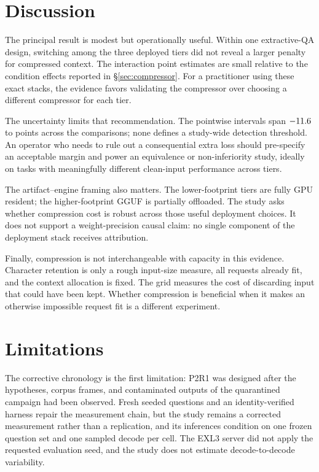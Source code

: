 \documentclass[11pt]{article}
\begin{document}
\section{Discussion}\label{sec:discussion}

The principal result is modest but operationally useful. Within one
extractive-QA design, switching among the three deployed tiers did not reveal
a larger penalty for compressed context. The interaction point estimates are
small relative to the condition effects reported in \S\ref{sec:compressor}.
For a practitioner using these exact stacks, the evidence favors validating
the compressor over choosing a different compressor for each tier.

The uncertainty limits that recommendation. The pointwise intervals span
$-11.6$ to \PtwoInterCiHighMax{} points across the comparisons;
none defines a study-wide detection threshold. An operator who needs to rule
out a consequential extra loss should pre-specify an acceptable margin and
power an equivalence or non-inferiority study, ideally on tasks with
meaningfully different clean-input performance across tiers.

The artifact--engine framing also matters. The lower-footprint tiers are fully
GPU resident; the higher-footprint GGUF is partially offloaded. The study asks
whether compression cost is robust across those useful deployment choices. It
does not support a weight-precision causal claim: no single component of the
deployment stack receives attribution.

Finally, compression is not interchangeable with capacity in this evidence.
Character retention is only a rough input-size measure, all requests already
fit, and the context allocation is fixed. The grid measures the cost of
discarding input that could have been kept. Whether compression is beneficial
when it makes an otherwise impossible request fit is a different experiment.

\section{Limitations}\label{sec:limits}

The corrective chronology is the first limitation: P2R1 was designed after the
hypotheses, corpus frames, and contaminated outputs of the quarantined
campaign had been observed. Fresh seeded questions and an identity-verified
harness repair the measurement chain, but the study remains a corrected
measurement rather than a replication, and its inferences condition on one
frozen question set and one sampled decode per cell. The EXL3 server did not
apply the requested evaluation seed, and the study does not estimate
decode-to-decode variability.
\end{document}
